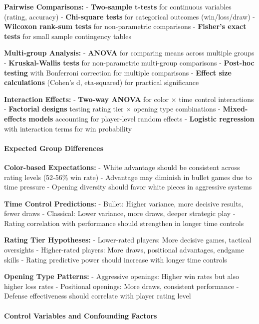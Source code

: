 \documentclass[
]{article}
\begin{document}
\textbf{Pairwise Comparisons:} - \textbf{Two-sample t-tests} for
continuous variables (rating, accuracy) - \textbf{Chi-square tests} for
categorical outcomes (win/loss/draw) - \textbf{Wilcoxon rank-sum tests}
for non-parametric comparisons - \textbf{Fisher's exact tests} for small
sample contingency tables

\textbf{Multi-group Analysis:} - \textbf{ANOVA} for comparing means
across multiple groups - \textbf{Kruskal-Wallis tests} for
non-parametric multi-group comparisons - \textbf{Post-hoc testing} with
Bonferroni correction for multiple comparisons - \textbf{Effect size
calculations} (Cohen's d, eta-squared) for practical significance

\textbf{Interaction Effects:} - \textbf{Two-way ANOVA} for color × time
control interactions - \textbf{Factorial designs} testing rating tier ×
opening type combinations - \textbf{Mixed-effects models} accounting for
player-level random effects - \textbf{Logistic regression} with
interaction terms for win probability

\paragraph{Expected Group Differences}\label{expected-group-differences}

\textbf{Color-based Expectations:} - White advantage should be
consistent across rating levels (52-56\% win rate) - Advantage may
diminish in bullet games due to time pressure - Opening diversity should
favor white pieces in aggressive systems

\textbf{Time Control Predictions:} - Bullet: Higher variance, more
decisive results, fewer draws - Classical: Lower variance, more draws,
deeper strategic play - Rating correlation with performance should
strengthen in longer time controls

\textbf{Rating Tier Hypotheses:} - Lower-rated players: More decisive
games, tactical oversights - Higher-rated players: More draws,
positional advantages, endgame skills - Rating predictive power should
increase with longer time controls

\textbf{Opening Type Patterns:} - Aggressive openings: Higher win rates
but also higher loss rates - Positional openings: More draws, consistent
performance - Defense effectiveness should correlate with player rating
level

\paragraph{Control Variables and Confounding
Factors}\label{control-variables-and-confounding-factors}
\end{document}
